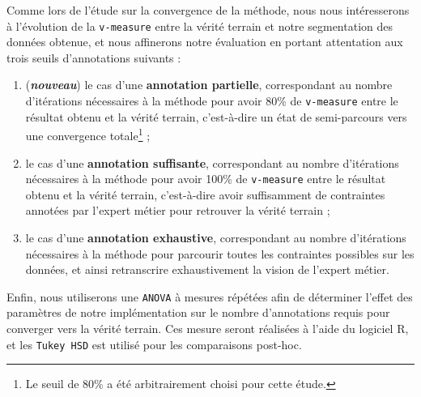 				Comme lors de l'étude sur la convergence de la méthode, nous nous intéresserons à l'évolution de la \texttt{v-measure} entre la vérité terrain et notre segmentation des données obtenue, et nous affinerons notre évaluation en portant attentation aux trois seuils d'annotations suivants :
				\begin{enumerate}
					\item (\textbf{\textit{nouveau}}) le cas d'une \textbf{annotation partielle}, correspondant au nombre d'itérations nécessaires à la méthode pour avoir 80\% de \texttt{v-measure} entre le résultat obtenu et la vérité terrain, c'est-à-dire un état de semi-parcours vers une convergence totale\footnote{Le seuil de 80\% a été arbitrairement choisi pour cette étude.} ;
					\item le cas d'une \textbf{annotation suffisante}, correspondant au nombre d'itérations nécessaires à la méthode pour avoir 100\% de \texttt{v-measure} entre le résultat obtenu et la vérité terrain, c'est-à-dire avoir suffisamment de contraintes annotées par l'expert métier pour retrouver la vérité terrain ;
					\item le cas d'une \textbf{annotation exhaustive}, correspondant au nombre d'itérations nécessaires à la méthode pour parcourir toutes les contraintes possibles sur les données, et ainsi retranscrire exhaustivement la vision de l'expert métier.
				\end{enumerate}
				
				Enfin, nous utiliserons une \texttt{ANOVA} à mesures répétées afin de déterminer l’effet des paramètres de notre implémentation sur le nombre d’annotations requis pour converger vers la vérité terrain. Ces mesure seront réalisées à l’aide du logiciel R, et les \texttt{Tukey HSD} est utilisé pour les comparaisons post-hoc.
				
